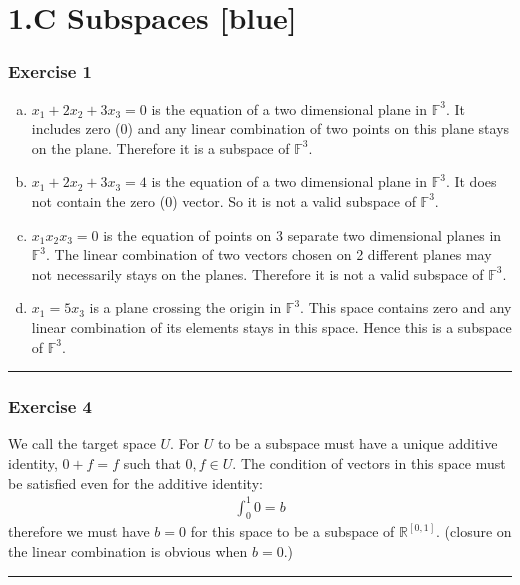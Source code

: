 \documentclass[12pt, letterpaper]{scrartcl}
\newcommand{\R}{\mathbb{R}}
\newcommand{\F}{\mathbb{F}}
\begin{document}
\vskip10mm
\section*{1.C Subspaces  \xrfill[2pt]{3pt}[blue]}
\subsubsection*{Exercise 1} 
\begin{enumerate}[(a)]
    \item $x_1+2x_2+3x_3=0$ is the equation of a two dimensional plane in $\F^3$. It includes zero ($0$) and any linear combination of two points on this plane stays on the plane. Therefore it is a subspace of $\F^3$.

    \item $x_1+2x_2+3x_3=4$ is the equation of a two dimensional plane in $\F^3$. It does not contain the zero (0) vector. So it is not a valid subspace of $\F^3$.

    \item $x_1x_2x_3=0$ is the equation of points on 3 separate two dimensional planes in $\F^3$. The linear combination of two vectors chosen on 2 different planes may not necessarily stays on the planes. Therefore it is not a valid subspace of $\F^3$.

    \item $x_1=5x_3$ is a plane crossing the origin in $\F^3$. This space contains zero and any linear combination of its elements stays in this space. Hence this is a subspace of $\F^3$. 
\end{enumerate}
\vskip1mm\hrule
\subsubsection*{Exercise 4}
We call the target space $U$. For $U$ to be a subspace must have a unique additive identity, $0 + f = f$ such that $0,f\in U$. The condition of vectors in this space must be satisfied even for the additive identity:
\begin{align*}
\int_0^1 0=b
\end{align*}
therefore we must have $b=0$ for this space to be a subspace of $\R^{[0,1]}$. (closure on the linear combination is obvious when $b=0$.)
\vskip1mm\hrule
\end{document}

